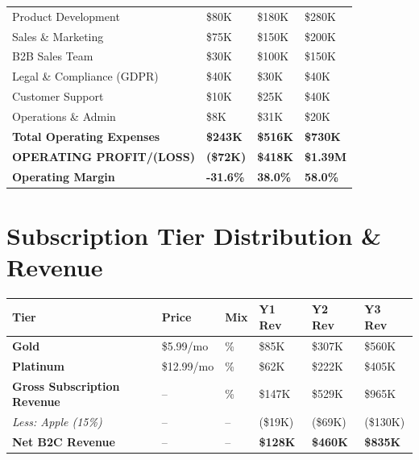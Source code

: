 \documentclass[11pt,a4paper]{report}
\begin{document}
\begin{center}
\begin{tabular}{>{\raggedright\arraybackslash}p{5cm} >{\centering\arraybackslash}p{2.5cm} >{\centering\arraybackslash}p{2.5cm} >{\centering\arraybackslash}p{2.5cm}}
\rowcolor{lightbg}
\quad Product Development & \$80K & \$180K & \$280K \\
\quad Sales \& Marketing & \$75K & \$150K & \$200K \\
\rowcolor{lightbg}
\quad B2B Sales Team & \$30K & \$100K & \$150K \\
\quad Legal \& Compliance (GDPR) & \$40K & \$30K & \$40K \\
\rowcolor{lightbg}
\quad Customer Support & \$10K & \$25K & \$40K \\
\quad Operations \& Admin & \$8K & \$31K & \$20K \\
\rowcolor{miloprimary!8}
\textbf{Total Operating Expenses} & \textbf{\$243K} & \textbf{\$516K} & \textbf{\$730K} \\
\midrule
\rowcolor{successgreen!10}
\textbf{OPERATING PROFIT/(LOSS)} & \textbf{(\$72K)} & \textbf{\$418K} & \textbf{\$1.39M} \\
\rowcolor{miloprimary!15}
\textbf{Operating Margin} & \textbf{-31.6\%} & \textbf{38.0\%} & \textbf{58.0\%} \\
\bottomrule
\end{tabular}
\end{center}

\section{Subscription Tier Distribution \& Revenue}

\begin{center}
\renewcommand{\arraystretch}{1.4}
\begin{tabular}{>{\raggedright\arraybackslash}p{2.5cm} >{\centering\arraybackslash}p{1.5cm} >{\centering\arraybackslash}p{1.5cm} >{\centering\arraybackslash}p{2cm} >{\centering\arraybackslash}p{2cm} >{\centering\arraybackslash}p{2cm}}
\toprule
\rowcolor{miloprimary!15}
\textbf{Tier} & \textbf{Price} & \textbf{Mix} & \textbf{Y1 Rev} & \textbf{Y2 Rev} & \textbf{Y3 Rev} \\
\midrule
\rowcolor{goldcolor!8}
\textcolor{goldcolor}{\textbf{Gold}} & \$5.99/mo & 70\% & \$85K & \$307K & \$560K \\
\rowcolor{platinumcolor!8}
\textcolor{platinumcolor}{\textbf{Platinum}} & \$12.99/mo & 30\% & \$62K & \$222K & \$405K \\
\midrule
\rowcolor{lightbg}
\textbf{Gross Subscription Revenue} & -- & 100\% & \$147K & \$529K & \$965K \\
\rowcolor{dangerred!8}
\textit{Less: Apple (15\%)} & -- & -- & (\$19K) & (\$69K) & (\$130K) \\
\rowcolor{successgreen!10}
\textbf{Net B2C Revenue} & -- & -- & \textbf{\$128K} & \textbf{\$460K} & \textbf{\$835K} \\
\bottomrule
\end{tabular}
\end{center}
\end{document}
